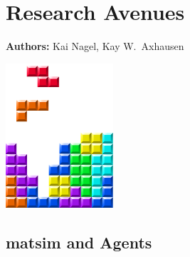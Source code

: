 \chapter{Research Avenues }
\label{ch:researchavenues}

\hfill \textbf{Authors:} Kai Nagel, Kay W.\ Axhausen

\begin{center} \includegraphics[width=0.3\textwidth, angle=0]{figures/MATSimBook.png} \end{center}

\section{\acrshort{matsim} and Agents}

%
%







